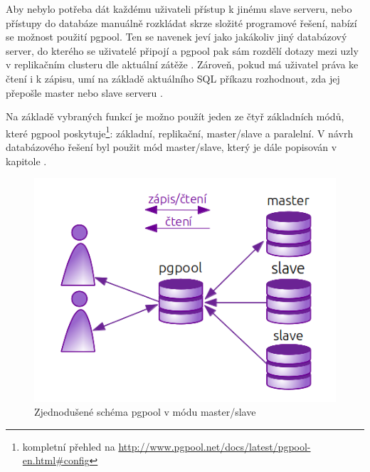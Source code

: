 Aby nebylo potřeba dát každému
uživateli přístup k jinému slave serveru, nebo přístupy do databáze manuálně
rozkládat skrze složité programové řešení, nabízí se možnost použití pgpool. 
Ten se navenek jeví jako jakákoliv jiný databázový server, do kterého se
uživatelé připojí a  pgpool pak sám rozdělí dotazy mezi uzly v replikačním
clusteru dle aktuální zátěže \citep{Boszormenyi2013}. Zároveň, pokud má
uživatel práva ke čtení i k zápisu, umí na základě aktuálního SQL příkazu
rozhodnout, zda jej přepošle master nebo slave serveru . 

Na základě vybraných funkcí je možno použít jeden ze čtyř základních módů, které pgpool poskytuje\footnote{kompletní přehled na \url{http://www.pgpool.net/docs/latest/pgpool-en.html\#config}}: základní, replikační, master/slave a paralelní. V návrh databázového řešení byl použit mód master/slave, který je dále popisován v kapitole .

      \begin{figure}[H]
        \centering
        \includegraphics[scale=1]{../../../grafy/obr/schema_pgpool.png}
        \caption{Zjednodušené schéma pgpool v módu master/slave}
        \label{opgpool}
      \end{figure}


